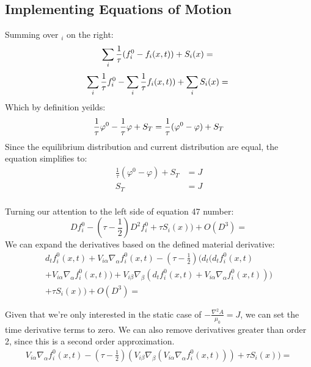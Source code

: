 \documentclass[12pt,a4paper]{article}
\begin{document}
\subsection{Implementing Equations of Motion}
Summing over $_i$ on the right:
\begin{equation}
\sum_i \frac{1}{\tau}(f_i^0-f_i(x,t)) + S_i(x) = \\
\end{equation}
\begin{equation}
\sum_i\frac{1}{\tau}f_i^0 - \sum_i \frac{1}{\tau}f_i(x,t)) + \sum_i S_i(x) = \\
\end{equation}
Which by definition yeilds: 
\begin{equation}
\frac{1}{\tau}\varphi^0 - \frac{1}{\tau}\varphi + S_T = \frac{1}{\tau}(\varphi^0 - \varphi) + S_T \\
\end{equation}
Since the equilibrium distribution and current distribution are equal, the equation simplifies to:
\begin{align}
\frac{1}{\tau}(\varphi^0 - \varphi) + S_T  &= J\\
 S_T  &= J\\
\end{align}

Turning our attention to the left side of equation 47 number:
\begin{equation}
Df_i^0 - (\tau - \frac{1}{2})D^2f_i^0  + \tau S_i(x)) + O(D^3) =
\end{equation}
We can expand the derivatives based on the defined material derivative:
\begin{align}
d_tf_i^0(x,t) + V_{i\alpha} \nabla_\alpha f_i^0(x,t) - (\tau - \frac{1}{2})(d_t(d_tf_i^0(x,t) \\ + V_{i\alpha} \nabla_\alpha f_i^0(x,t)) + V_{i\beta} \nabla_\beta (d_tf_i^0(x,t) + V_{i\alpha} \nabla_\alpha f_i^0(x,t))) \\+ \tau S_i(x)) + O(D^3) =
\end{align}

Given that we're only interested in the static case of $-\frac{\nabla^2A}{\mu_0} = J$, we can set the time derivative terms to zero. We can also remove derivatives greater than order 2, since this is a second order approximation.
\begin{align}
V_{i\alpha} \nabla_\alpha f_i^0(x,t) - (\tau - \frac{1}{2}) (V_{i\beta} \nabla_\beta (V_{i\alpha} \nabla_\alpha f_i^0(x,t))) + \tau S_i(x)) =
\end{align}
\end{document}
